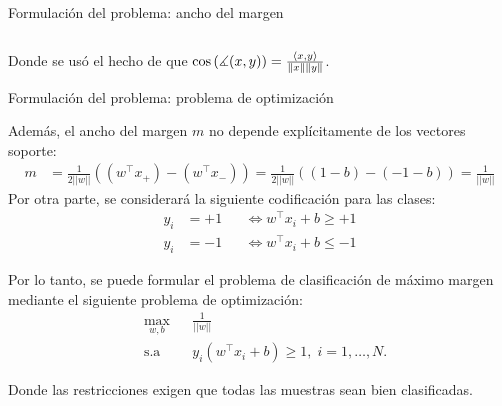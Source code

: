 \documentclass[9pt]{beamer}
\begin{document}
\begin{frame}{Formulación del problema: ancho del margen}
\begin{columns}
\begin{column}{0.55\textwidth}
\end{column}

\end{columns}

Donde se usó el hecho de que $\cos\left(\measuredangle(x,y)\right) = \frac{\langle x,y\rangle}{\left\lVert x\right\rVert\left\lVert y\right\rVert}$.
	
\end{frame}

\begin{frame}{Formulación del problema: problema de optimización}

Además, el ancho del margen $m$ no depende explícitamente de los vectores soporte:
\begin{align*}
    m &= \frac{1}{2||w||} \left( (w^\top x_{+}) - (w^\top x_{-})\right)
    = \frac{1}{2||w||} \left((1-b) - (-1-b)\right)
    = \frac{1}{||w||}
\end{align*}\pause
Por otra parte, se considerará la siguiente codificación para las clases:
\begin{alignat*}{3}
    y_i&=+1 &&\Leftrightarrow w^\top x_i + b \geq +1 \\
    y_i &=-1 &&\Leftrightarrow w^\top x_i + b \leq -1
 \end{alignat*}\pause
 
Por lo tanto, se puede formular el problema de clasificación de máximo margen mediante el siguiente problema de optimización:
\begin{equation*}
\begin{aligned}
& \underset{w,b}{\text{max}}
& & \frac{1}{||w||}\\
& \text{s.a}
& & y_i (w^\top x_i +b) \geq 1, \; i = 1, \ldots, N.
\end{aligned}
\end{equation*}

Donde las restricciones exigen que todas las muestras sean bien clasificadas.
	
\end{frame}
\end{document}
